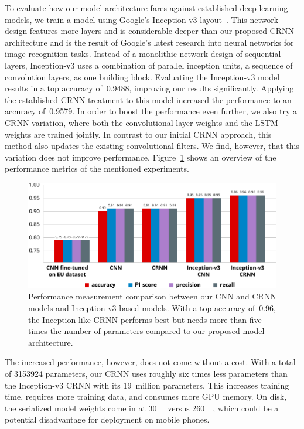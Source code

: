 To evaluate how our model architecture fares against established deep learning models, we train a model using Google's Inception-v3 layout~\cite{szegedy2016rethinking}. This network design features more layers and is considerable deeper than our proposed CRNN architecture and is the result of Google's latest research into neural networks for image recognition tasks. Instead of a monolithic network design of sequential layers, Inception-v3 uses a combination of parallel inception units, a sequence of convolution layers, as one building block. Evaluating the Inception-v3 model results in a top accuracy of~\num{0.9488}, improving our results significantly. Applying the established CRNN treatment to this model increased the performance to an accuracy of~\num{0.9579}. In order to boost the performance even further, we also try a CRNN variation, where both the convolutional layer weights and the LSTM weights are trained jointly. In contrast to our initial CRNN approach, this method also updates the existing convolutional filters. We find, however, that this variation does not improve performance. Figure~\ref{fig:news_results} shows an overview of the performance metrics of the mentioned experiments.
%
	\begin{figure}[tp]
  		\centering
    	\includegraphics{plots/results_news_plot-new.pdf}
    	\caption{Performance measurement comparison between our CNN and CRNN models and Inception-v3-based models. With a top accuracy of~\num{0.96}, the Inception-like CRNN performs best but needs more than five times the number of parameters compared to our proposed model architecture.}
    	\label{fig:news_results}
	\end{figure}
%
The increased performance, however, does not come without a cost. With a total of \num{3153924} parameters, our CRNN uses roughly six times less parameters than the Inception-v3 CRNN with its \num{19}~million parameters. This increases training time, requires more training data, and consumes more GPU memory. On disk, the serialized model weights come in at \SI{30}{\mega\byte} versus \SI{260}{\mega\byte}, which could be a potential disadvantage for deployment on mobile phones.



